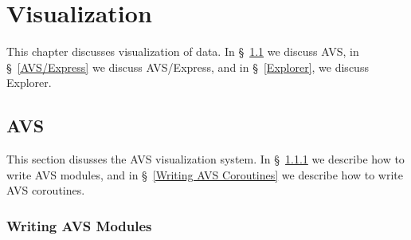 
\chapter{Visualization}
\label{Visualization}

This chapter discusses visualization of \parflow{} data.
In \S~\ref{AVS} we discuss AVS,
in \S~\ref{AVS/Express} we discuss AVS/Express, and
in \S~\ref{Explorer}, we discuss Explorer.


\section{AVS}
\label{AVS}

This section disusses the AVS visualization system.
In \S~\ref{Writing AVS Modules} we describe how to write AVS modules, and
in \S~\ref{Writing AVS Coroutines} we describe how to write AVS coroutines.


\subsection{Writing AVS Modules}
\label{Writing AVS Modules}

